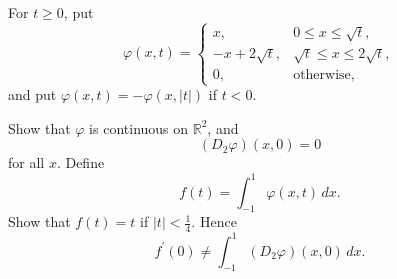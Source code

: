 	\begin{exercise}[Rudin 9.28]
		For $t\geq0$, put
		\begin{equation}
			\varphi(x,t)=
			\begin{cases}
				x, & 0\leq x\leq\sqrt{t}, \\
				-x+2\sqrt{t}, & \sqrt{t}\leq x\leq2\sqrt{t}, \\
				0, & \text{otherwise},
			\end{cases}
		\end{equation}
		and put $\varphi(x,t)=-\varphi(x,\lvert t\rvert)$ if $t<0$.

		Show that $\varphi$ is continuous on $\mathbb{R}^2$, and
		\begin{equation}
			(D_2\varphi)(x,0)=0
		\end{equation}
		for all $x$. Define
		\begin{equation}
			f(t)=\int_{-1}^1\varphi(x,t)\,dx.
		\end{equation}
		Show that $f(t)=t$ if $\lvert t\rvert<\frac14$. Hence
		\begin{equation}
			f^\prime(0)
			\neq
			\int_{-1}^1(D_2\varphi)(x,0)\,dx.
		\end{equation}
	\end{exercise}
